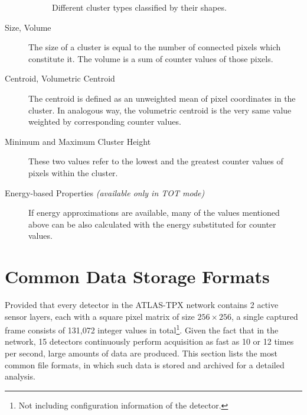 \begin{description}
\begin{figure}[t]
\begin{center}

    \caption{Different cluster types classified by their shapes.}
    \label{fig:cluster-types}
    \end{center}
    \end{figure}

	\item[Size, Volume]
	The size of a cluster is equal to the number of connected pixels which constitute it. The volume is a sum of counter values of those pixels.

	\item[Centroid, Volumetric Centroid]
	The centroid is defined as an unweighted mean of pixel coordinates in the cluster. In analogous way, the volumetric centroid is the very same value weighted by corresponding counter values. 

	\item[Minimum and Maximum Cluster Height]
	These two values refer to the lowest and the greatest counter values of pixels within the cluster.

	\item[Energy-based Properties \textit{(available only in TOT mode)}]
	If energy approximations are available, many of the values mentioned above can be also calculated with the energy substituted for counter values.
\end{description}

\section{Common Data Storage Formats}
\label{db:storage-formats}
Provided that every detector in the ATLAS-TPX network contains 2 active sensor layers, each with a square pixel matrix of size $256\times 256$, a single captured frame consists of 131,072 integer values in total\footnote{Not including configuration information of the detector.}. Given the fact that in the network, 15 detectors continuously perform acquisition as fast as 10 or 12 times per second, large amounts of data are produced. This section lists the most common file formats, in which such data is stored and archived for a detailed analysis.

